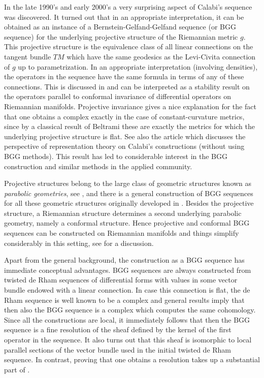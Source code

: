 \documentclass[12pt,a4paper]{amsart}
\numberwithin{theorem}{section}
\numberwithin{equation}{section}
\theoremstyle{definition}
\theoremstyle{remark}
\begin{document}
In the late 1990's and early 2000's a very surprising aspect of Calabi's sequence was
discovered. It turned out that in an appropriate interpretation, it can be obtained
as an instance of a Bernstein-Gelfand-Gelfand sequence (or BGG sequence) for the
underlying projective structure of the Riemannian metric $g$. This projective
structure is the equivalence class of all linear connections on the tangent bundle
$TM$ which have the same geodesics as the Levi-Civita connection of $g$ up to
parametrization. In an appropriate interpretation (involving densities), the
operators in the sequence have the same formula in terms of any of these
connections. This is discussed in \cite{Mike-Elasticity} and can be interpreted as a
stability result on the operators parallel to conformal invariance of differential
operators on Riemannian manifolds. Projective invariance gives a nice explanation for
the fact that one obtains a complex exactly in the case of constant-curvature
metrics, since by a classical result of Beltrami these are exactly the metrics for
which the underlying projective structure is flat. See also the article
\cite{Khavkine} which discusses the perspective of representation theory on Calabi's
constructions (without using BGG methods). This result has led to considerable
interest in the BGG construction and similar methods in the applied community.

Projective structures belong to the large class of geometric structures known as
\textit{parabolic geometries}, see \cite{book}, and there is a general construction
of BGG sequences for all these geometric structures originally developed in
\cite{CSS-BGG}. Besides the projective structure, a Riemannian structure determines
a second underlying parabolic geometry, namely a conformal structure. Hence
projective and conformal BGG sequences can be constructed on Riemannian manifolds and
things simplify considerably in this setting, see \cite{Riem-BGG} for a discussion.

Apart from the general background, the construction as a BGG sequence has immediate
conceptual advantages. BGG sequences are always constructed from twisted de Rham
sequences of differential forms with values in some vector bundle endowed with a
linear connection. In case this connection is flat, the de Rham sequence is well
known to be a complex and general results imply that then also the BGG sequence is a
complex which computes the same cohomology. Since all the constructions are local, it
immediately follows that then the BGG sequence is a fine resolution of the sheaf
defined by the kernel of the first operator in the sequence. It also turns out that
this sheaf is isomorphic to local parallel sections of the vector bundle used in the
initial twisted de Rham sequence. In contrast, proving that one obtains a resolution
takes up a substantial part of \cite{Calabi}.
\end{document}
